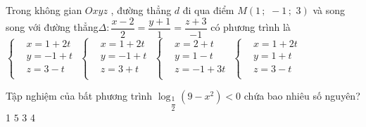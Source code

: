 \begin{ex}%
 Trong không gian $Oxyz$ , đường thẳng $d$ đi qua điểm $M\left(1\,;\,\,-1\,;\,\,3\right)$ và song song với đường thẳng$\Delta :\dfrac{x-2}{2}=\dfrac{y+1}{1}=\dfrac{z+3}{-1}$ có phương trình là
 \choice
 {\True $\left\{\begin{aligned}
 & x=1+2t\\ 
 & y=-1+t\\ 
 & z=3-t\\ 
 \end{aligned}\right.$}
 {$\left\{\begin{aligned}
 & x=1+2t\\ 
 & y=-1+t\\ 
 & z=3+t\\ 
 \end{aligned}\right.$}
 {$\left\{\begin{aligned}
 & x=2+t\\ 
 & y=1-t\\ 
 & z=-1+3t\\ 
 \end{aligned}\right.$}
 {$\left\{\begin{aligned}
 & x=1+2t\\ 
 & y=1+t\\ 
 & z=3-t\\ 
 \end{aligned}\right.$}
\end{ex}
\begin{ex}%
 Tập nghiệm của bất phương trình $\log_{\dfrac{1}{2}}\left(9-x^2\right)<0$ chứa bao nhiêu số nguyên?
 \choice
 {1}
 {\True $5$}
 {$3$}
 {4}
\end{ex}
